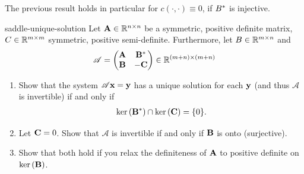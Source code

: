 \begin{remark}
  The previous result holds in particular for
  $c(\cdot,\cdot) \equiv 0$, if $B^*$ is injective.
\end{remark}

\begin{Problem}{saddle-unique-solution}
  Let $\mathbf A \in \mathbb R^{n\times n}$ be a symmetric, positive definite
  matrix, $C\in \mathbb R^{m\times m}$ symmetric, positive
  semi-definite. Furthermore, let $B \in \mathbb R^{m\times n}$ and
  \begin{gather}
    \mathscr A= 
    \begin{pmatrix}
      \mathbf A & \mathbf B^* \\ \mathbf B & -\mathbf C
    \end{pmatrix}
    \in \mathbb R^{(m+n)\times (m+n)}
  \end{gather}
  \begin{enumerate}
  \item Show that the system $\mathscr A \mathbf x = \mathbf y$ has a unique
    solution for each $\mathbf y$ (and thus $\mathscr A$ is invertible) if
    and only if
    \begin{gather}
      \operatorname{ker}\left(\mathbf B^*\right) \cap \operatorname{ker}\left(\mathbf C\right) = \{0\}.
    \end{gather}
  \item Let $\mathbf C = 0$. Show that $\mathscr A$ is invertible if and
    only if $\mathbf B$ is onto (surjective).
  \item Show that both hold if you relax the definiteness of $\mathbf A$ to
    positive definite on $\operatorname{ker}\left(\mathbf B\right)$.
  \end{enumerate}
\end{Problem}

